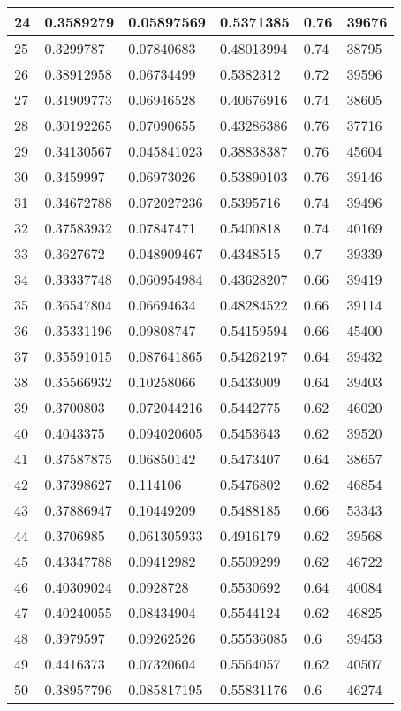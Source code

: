 \begin{longtable}{|l|l|l|l|l|l|}
24 & 0.3589279 & 0.05897569 & 0.5371385 & 0.76 & 39676 \\ \hline 
25 & 0.3299787 & 0.07840683 & 0.48013994 & 0.74 & 38795 \\ \hline 
26 & 0.38912958 & 0.06734499 & 0.5382312 & 0.72 & 39596 \\ \hline 
27 & 0.31909773 & 0.06946528 & 0.40676916 & 0.74 & 38605 \\ \hline 
28 & 0.30192265 & 0.07090655 & 0.43286386 & 0.76 & 37716 \\ \hline 
29 & 0.34130567 & 0.045841023 & 0.38838387 & 0.76 & 45604 \\ \hline 
30 & 0.3459997 & 0.06973026 & 0.53890103 & 0.76 & 39146 \\ \hline 
31 & 0.34672788 & 0.072027236 & 0.5395716 & 0.74 & 39496 \\ \hline 
32 & 0.37583932 & 0.07847471 & 0.5400818 & 0.74 & 40169 \\ \hline 
33 & 0.3627672 & 0.048909467 & 0.4348515 & 0.7 & 39339 \\ \hline 
34 & 0.33337748 & 0.060954984 & 0.43628207 & 0.66 & 39419 \\ \hline 
35 & 0.36547804 & 0.06694634 & 0.48284522 & 0.66 & 39114 \\ \hline 
36 & 0.35331196 & 0.09808747 & 0.54159594 & 0.66 & 45400 \\ \hline 
37 & 0.35591015 & 0.087641865 & 0.54262197 & 0.64 & 39432 \\ \hline 
38 & 0.35566932 & 0.10258066 & 0.5433009 & 0.64 & 39403 \\ \hline 
39 & 0.3700803 & 0.072044216 & 0.5442775 & 0.62 & 46020 \\ \hline 
40 & 0.4043375 & 0.094020605 & 0.5453643 & 0.62 & 39520 \\ \hline 
41 & 0.37587875 & 0.06850142 & 0.5473407 & 0.64 & 38657 \\ \hline 
42 & 0.37398627 & 0.114106 & 0.5476802 & 0.62 & 46854 \\ \hline 
43 & 0.37886947 & 0.10449209 & 0.5488185 & 0.66 & 53343 \\ \hline 
44 & 0.3706985 & 0.061305933 & 0.4916179 & 0.62 & 39568 \\ \hline 
45 & 0.43347788 & 0.09412982 & 0.5509299 & 0.62 & 46722 \\ \hline 
46 & 0.40309024 & 0.0928728 & 0.5530692 & 0.64 & 40084 \\ \hline 
47 & 0.40240055 & 0.08434904 & 0.5544124 & 0.62 & 46825 \\ \hline 
48 & 0.3979597 & 0.09262526 & 0.55536085 & 0.6 & 39453 \\ \hline 
49 & 0.4416373 & 0.07320604 & 0.5564057 & 0.62 & 40507 \\ \hline 
50 & 0.38957796 & 0.085817195 & 0.55831176 & 0.6 & 46274 \\ \hline 
\end{longtable}